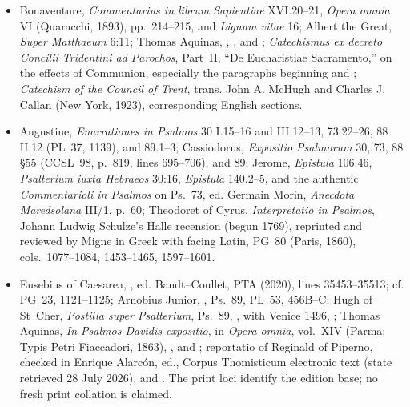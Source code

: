 {\begin{itemize}[leftmargin=1.1em,labelsep=0.35em,itemsep=0em,topsep=0.15em,parsep=0pt]
\item Bonaventure, \emph{Commentarius in librum Sapientiae} XVI.20--21,
\emph{Opera omnia} VI (Quaracchi, 1893), pp.~214--215, and \emph{Lignum
vitae} 16; Albert the Great, \emph{Super Matthaeum} 6:11; Thomas Aquinas,
,
, and
; \emph{Catechismus ex decreto Concilii Tridentini ad Parochos},
Part~II, ``De Eucharistiae Sacramento,'' on the effects of Communion,
especially the paragraphs beginning  and
; \emph{Catechism of the Council of Trent}, trans. John A.
McHugh and Charles J. Callan (New York, 1923), corresponding English sections.

\item Augustine, \emph{Enarrationes in Psalmos} 30 I.15--16 and III.12--13,
73.22--26, 88 II.12 (PL~37, 1139), and 89.1--3; Cassiodorus,
\emph{Expositio Psalmorum} 30, 73, 88 \S55 (CCSL~98, p.~819, lines
695--706), and 89; Jerome, \emph{Epistula} 106.46,
\emph{Psalterium iuxta Hebraeos} 30:16, \emph{Epistula} 140.2--5, and the
authentic \emph{Commentarioli in Psalmos} on Ps.~73, ed. Germain Morin,
\emph{Anecdota Maredsolana} III/1, p.~60; Theodoret of Cyrus,
\emph{Interpretatio in Psalmos}, Johann Ludwig Schulze's Halle recension
(begun 1769), reprinted and reviewed by Migne in Greek with facing Latin,
PG~80 (Paris, 1860), cols.~1077--1084, 1453--1465, 1597--1601.

\item Eusebius of Caesarea,
, ed. Bandt--Coullet, PTA (2020), lines 35453--35513; cf. PG~23, 1121--1125;
Arnobius Junior,
, Ps.~89, PL~53, 456B--C; Hugh of
St~Cher, \emph{Postilla super Psalterium}, Ps.~89,
, with Venice 1496,
;
Thomas Aquinas, \emph{In Psalmos Davidis expositio}, in \emph{Opera omnia},
vol.~XIV (Parma: Typis Petri Fiaccadori, 1863),
, and
; reportatio of Reginald of Piperno, checked in Enrique
Alarcón, ed., Corpus Thomisticum electronic text (state retrieved 28 July
2026),  and . The print loci identify the edition base; no fresh print collation
is claimed.


\end{itemize}}
